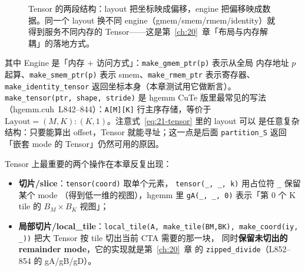 \begin{figure}[htbp]
\caption{Tensor 的两段结构：layout 把坐标映成偏移，engine 把偏移映成数据。同一个 layout 换不同 engine（gmem/smem/rmem/identity）就得到服务不同内存的 Tensor——这是第~\ref{ch:20}~章「布局与内存解耦」的落地方式。}
\label{fig:21-1}
\end{figure}

其中 Engine 是「内存 $+$ 访问方式」：\texttt{make\_\allowbreak{}gmem\_\allowbreak{}ptr\allowbreak{}(p)} 表示从全局
内存地址 $p$ 起算、\texttt{make\_\allowbreak{}smem\_\allowbreak{}ptr\allowbreak{}(p)} 表示 smem、\texttt{make\_\allowbreak{}rmem\_\allowbreak{}ptr}
表示寄存器、\texttt{make\_\allowbreak{}identity\_\allowbreak{}tensor} 返回坐标本身（本章测试用它做断言）。
\texttt{make\_\allowbreak{}tensor\allowbreak{}(ptr,\allowbreak{} shape,\allowbreak{} stride)} 是 hgemm CuTe 版里最常见的写法
（hgemm.cuh~L842--844）：\texttt{A[M][K]} 行主序存储，等价于
$\mathrm{Layout} = (M,K){:}(K,1)$。注意式~\eqref{eq:21-tensor} 里的 layout 可以
是任意复杂结构：只要能算出 offset，Tensor 就能寻址；这一点是后面
\texttt{partition\_S} 返回「嵌套 mode 的 Tensor」仍然可用的原因。

Tensor 上最重要的两个操作在本章反复出现：

\begin{itemize}
  \item \textbf{切片/slice}：\texttt{tensor\allowbreak{}(coord)} 取单个元素，
        \texttt{tensor(\_, \_, k)} 用占位符 \texttt{\_} 保留某个 mode
        （得到低一维的视图），hgemm 里
        \texttt{gA(\_, \_, 0)} 表示「第 0 个 K tile 的 $B_M\times B_K$ 视图」；
  \item \textbf{局部切片/local\_tile}：\texttt{local\_\allowbreak{}tile\allowbreak{}(A,\allowbreak{} make\_\allowbreak{}tile\allowbreak{}(BM,\allowbreak{}BK),\allowbreak{}
        make\_\allowbreak{}coord\allowbreak{}(iy,\allowbreak{} \_\allowbreak{}))} 把大 Tensor 按 tile 切出当前 CTA 需要的那一块，
        同时\textbf{保留未切出的 remainder mode}，它的实现就是第~\ref{ch:20}~章
        的 \texttt{zipped\_\allowbreak{}divide}（L852--854 的 gA/gB/gD）。
\end{itemize}


